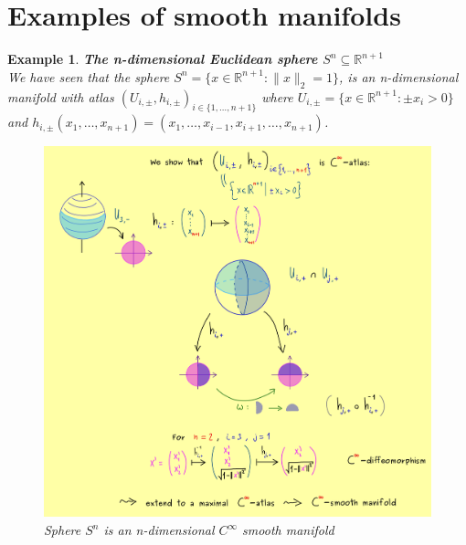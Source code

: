 \documentclass[11pt]{book} %
\newtheorem*{example*}{Example}
\begin{document}

\section{Examples of smooth manifolds}

\begin{example*}{\textbf{The n-dimensional Euclidean sphere \( S^n \subseteq \mathbb{R}^{n+1} \)}} \\
    We have seen that the sphere \( S^n = \{ x \in \mathbb{R}^{n+1} : \| x \|_2 = 1 \} \), 
    is an n-dimensional manifold with atlas \( (U_{i, \pm}, h_{i, \pm})_{i \in \{1, \dots ,n+1\}} \) 
    where \( U_{i, \pm} = \{ x \in \mathbb{R}^{n+1} : \pm x_i > 0 \} \) and \( h_{i, \pm}(x_1, \ldots, x_{n+1}) = (x_1, \ldots, x_{i-1}, x_{i+1}, \ldots, x_{n+1}) \).
    
    \begin{figure}[H]
        \centering
        \includegraphics[width=\textwidth]{Figs/sphere_is_C^k_smooth.png}
        \caption{Sphere \( S^n \) is an n-dimensional $C^{\infty}$ smooth manifold}
    \end{figure}
    
\end{example*}
\end{document}
